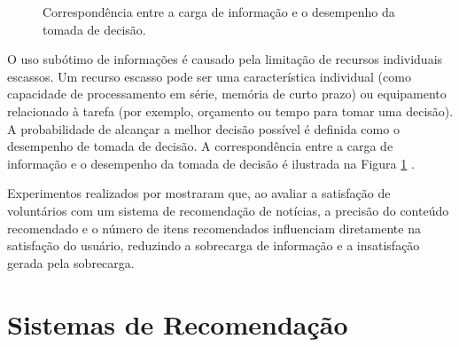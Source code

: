 \vspace{0.2cm}
\begin{figure}[h]
    \caption{Correspondência entre a carga de informação e o desempenho da tomada
    de decisão.}
    \label{fig:u_invertida}
\end{figure}
\vspace{0.2cm}

O uso subótimo de informações é causado
pela limitação de recursos individuais escassos. Um recurso escasso pode ser uma
característica individual (como capacidade de processamento em série, memória de
curto prazo) ou equipamento relacionado à tarefa (por exemplo, orçamento ou
tempo para tomar uma decisão). A probabilidade de alcançar a melhor decisão
possível é definida como o desempenho de tomada de decisão. A correspondência
entre a carga de informação e o desempenho da tomada de decisão é ilustrada na
Figura \ref{fig:u_invertida} \cite{roetzel2019information}.

Experimentos realizados por \citet{liang2006personalized} mostraram que, ao
avaliar a satisfação de voluntários com um sistema de recomendação de notícias,
a precisão do conteúdo recomendado e o número de itens
recomendados influenciam diretamente na satisfação do usuário, reduzindo a
sobrecarga de informação e a insatisfação gerada pela sobrecarga.

\section{Sistemas de Recomendação}

